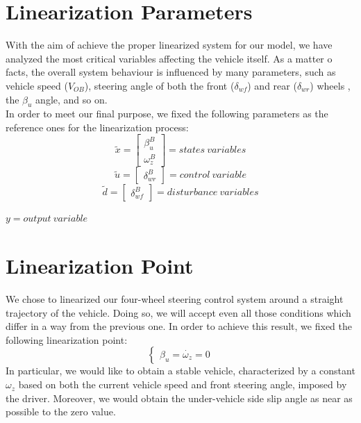 \section{Linearization Parameters} 
	With the aim of achieve the proper linearized system for our model, we have analyzed the most critical variables affecting the vehicle itself. As a matter o facts, the overall system behaviour is influenced by many parameters, such as vehicle speed ($V_{OB}$), steering angle of both the front ($\delta_{wf}$) and rear ($\delta_{wr}$) wheels , the $\beta_{u}$ angle, and so on. \\
	In order to meet our final purpose, we fixed the following parameters as the reference ones for the linearization process:\\
		\begin{equation*}
			\tilde{x} =
			\begin{bmatrix}
			\beta_{u}^{B} \\\omega_{z}^{B}
			\end{bmatrix} = states \ variables
		\end{equation*}\quad
		\begin{equation*} 
			\tilde{u} =
			\begin{bmatrix}
			\delta_{wr}^{B} 
			\end{bmatrix} = control \ variable
		\end{equation*}\quad
		\begin{equation*} 
			\tilde{d} =
			\begin{bmatrix}
			\delta_{wf}^{B} 
			\end{bmatrix} = disturbance \ variables
		\end{equation*}
		\begin{center}
			$ y = output \ variable $	
		\end{center}
\section{Linearization Point} 
	We chose to linearized our four-wheel steering control system around a straight trajectory of the vehicle. Doing so, we will accept even all those conditions which differ in a way from the previous one. In order to achieve this result, we fixed the following linearization point:
		\begin{equation*}
			\begin{cases}
			\beta_{u} = \dot{\omega_{z}} = 0
			\end{cases}
		\end{equation*}
	In particular, we would like to obtain a stable vehicle, characterized by a constant $\omega_{z}$ based on both the current vehicle speed and front steering angle, imposed by the driver. Moreover, we would obtain the under-vehicle side slip angle as near as possible to the zero value.
